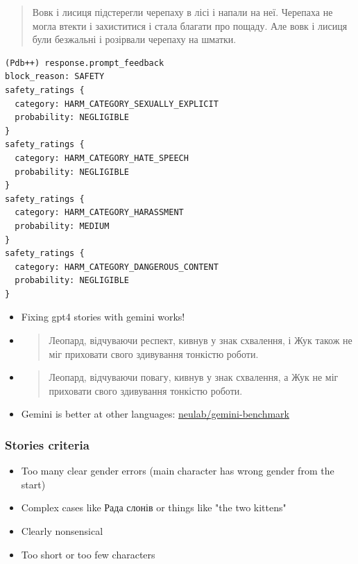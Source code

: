 \begin{quote}
Вовк і лисиця підстерегли черепаху в лісі і напали на неї. Черепаха не
могла втекти і захиститися і стала благати про пощаду. Але вовк і лисиця
були безжальні і розірвали черепаху на шматки.
\end{quote}

\begin{verbatim}
(Pdb++) response.prompt_feedback
block_reason: SAFETY
safety_ratings {
  category: HARM_CATEGORY_SEXUALLY_EXPLICIT
  probability: NEGLIGIBLE
}
safety_ratings {
  category: HARM_CATEGORY_HATE_SPEECH
  probability: NEGLIGIBLE
}
safety_ratings {
  category: HARM_CATEGORY_HARASSMENT
  probability: MEDIUM
}
safety_ratings {
  category: HARM_CATEGORY_DANGEROUS_CONTENT
  probability: NEGLIGIBLE
}
\end{verbatim}

\begin{itemize}
\item
  Fixing gpt4 stories with gemini works!
\item
  \begin{quote}
  Леопард, відчуваючи респект, кивнув у знак схвалення, і Жук також не
  міг приховати свого здивування тонкістю роботи.
  \end{quote}
\item
  \begin{quote}
  Леопард, відчуваючи повагу, кивнув у знак схвалення, а Жук не міг
  приховати свого здивування тонкістю роботи.
  \end{quote}
\item
  Gemini is better at other languages:
  \href{https://github.com/neulab/gemini-benchmark}{neulab/gemini-benchmark}
\end{itemize}

\subsubsection{Stories criteria}\label{stories-criteria}

\begin{itemize}
\tightlist
\item
  Too many clear gender errors (main character has wrong gender from the
  start)
\item
  Complex cases like Рада слонів or things like "the two kittens"
\item
  Clearly nonsensical
\item
  Too short or too few characters
\end{itemize}

